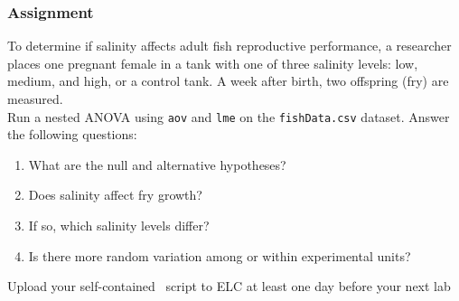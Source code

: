 \documentclass[color=usenames,dvipsnames]{beamer}\usepackage[]{graphicx}\usepackage[]{color}
\newcommand{\inr}[1]{\colorbox{inlinecolor}{\texttt{#1}}}
\begin{document}
\begin{frame}[fragile]
  \frametitle{Assignment}
  \small
  To determine if salinity affects adult fish reproductive
  performance, a researcher places one pregnant female in a tank with
  one of three salinity levels: low, medium, and high, or a control
  tank. A week after birth, two offspring (fry) are measured. \\
  \vfill
  Run a nested ANOVA using \inr{aov} and \inr{lme} on the
  {\tt fishData.csv} dataset. Answer the following questions:
\begin{enumerate}[\bf (1)]
  \item What are the null and alternative hypotheses?
  \item Does salinity affect fry growth?
  \item If so, which salinity levels differ?
  \item Is there more random variation among or within experimental units?
\end{enumerate}

\vfill
\centering
\normalsize
Upload your self-contained \R~script to ELC at least one
day before your next lab \\
\end{frame}
\end{document}
